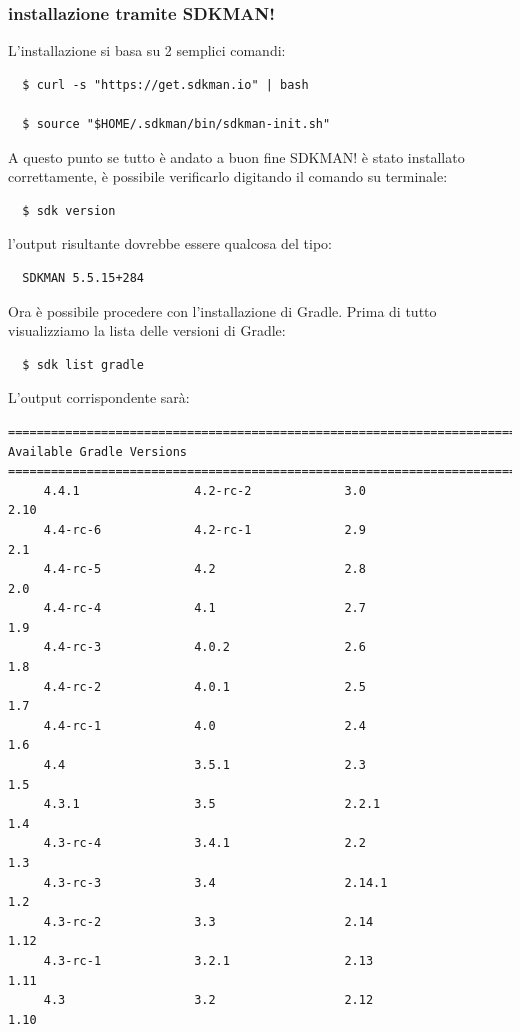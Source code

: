 \documentclass{article}
\begin{document}
\begin{flushleft}
\subsubsection{installazione tramite SDKMAN!}
L'installazione si basa su 2 semplici comandi:
\begin{verbatim}
  $ curl -s "https://get.sdkman.io" | bash
  
  $ source "$HOME/.sdkman/bin/sdkman-init.sh" \end{verbatim}
A questo punto se tutto è andato a buon fine SDKMAN! è stato installato correttamente, è possibile verificarlo digitando il comando su terminale:
\begin{verbatim}
  $ sdk version \end{verbatim}
l'output risultante dovrebbe essere qualcosa del tipo:
\begin{verbatim}
  SDKMAN 5.5.15+284 \end{verbatim}
Ora è possibile procedere con l'installazione di Gradle. Prima di tutto visualizziamo la lista delle versioni di Gradle:
\begin{verbatim}
  $ sdk list gradle \end{verbatim}
L'output corrispondente sarà:
\begin{verbatim}
================================================================================
Available Gradle Versions
================================================================================
     4.4.1                4.2-rc-2             3.0                  2.10           
     4.4-rc-6             4.2-rc-1             2.9                  2.1            
     4.4-rc-5             4.2                  2.8                  2.0            
     4.4-rc-4             4.1                  2.7                  1.9            
     4.4-rc-3             4.0.2                2.6                  1.8            
     4.4-rc-2             4.0.1                2.5                  1.7            
     4.4-rc-1             4.0                  2.4                  1.6            
     4.4                  3.5.1                2.3                  1.5            
     4.3.1                3.5                  2.2.1                1.4            
     4.3-rc-4             3.4.1                2.2                  1.3            
     4.3-rc-3             3.4                  2.14.1               1.2            
     4.3-rc-2             3.3                  2.14                 1.12           
     4.3-rc-1             3.2.1                2.13                 1.11           
     4.3                  3.2                  2.12                 1.10           

\end{verbatim}
\end{flushleft}
\end{document}
